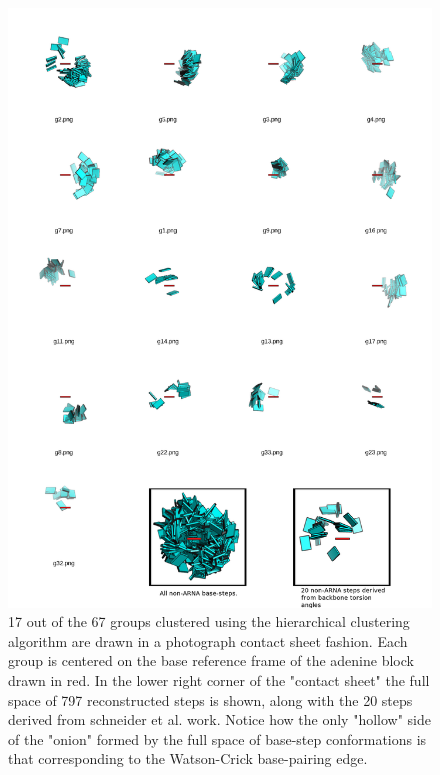 \begin{figure}
\centering
\includegraphics[angle=0, scale=0.35]{Chapter2/k67_17.png}
\caption{17  out of  the 67  groups clustered  using  the hierarchical
  clustering  algorithm  are  drawn  in  a  photograph  contact  sheet
  fashion. Each group  is centered on the base  reference frame of the
  adenine  block  drawn in  red.  In the  lower  right  corner of  the
  "contact sheet" the full space  of 797 reconstructed steps is shown,
  along with the  20 steps derived from schneider  et al. work. Notice
  how the only "hollow" side of the "onion" formed by the full space of
  base-step  conformations is that  corresponding to  the Watson-Crick
  base-pairing edge.}
\label{fig:noarnak67}
\end{figure}





